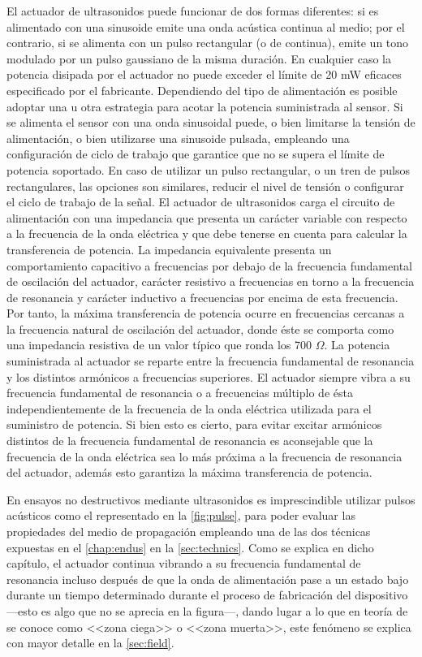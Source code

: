 El actuador de ultrasonidos puede funcionar de dos formas diferentes: si es
alimentado con una sinusoide emite una onda acústica continua al medio; por
el contrario, si se alimenta con un pulso rectangular (o de continua),
emite un tono modulado por un pulso gaussiano de la misma duración. En
cualquier caso la potencia disipada por el actuador no puede exceder el
límite de 20 mW eficaces especificado por el fabricante. Dependiendo del
tipo de alimentación es posible adoptar una u otra estrategia para acotar
la potencia suministrada al sensor. Si se alimenta el sensor con una onda
sinusoidal puede, o bien limitarse la tensión de alimentación, o bien
utilizarse una sinusoide pulsada, empleando una configuración de ciclo de
trabajo que garantice que no se supera el límite de potencia soportado. En
caso de utilizar un pulso rectangular, o un tren de pulsos rectangulares,
las opciones son similares, reducir el nivel de tensión o configurar el
ciclo de trabajo de la señal. El actuador de ultrasonidos carga el circuito
de alimentación con una impedancia que presenta un carácter variable con
respecto a la frecuencia de la onda eléctrica y que debe tenerse en cuenta
para calcular la transferencia de potencia. La impedancia equivalente
presenta un comportamiento capacitivo a frecuencias por debajo de la
frecuencia fundamental de oscilación del actuador, carácter resistivo a
frecuencias en torno a la frecuencia de resonancia y carácter inductivo a
frecuencias por encima de esta frecuencia. Por tanto, la máxima
transferencia de potencia ocurre en frecuencias cercanas a la frecuencia
natural de oscilación del actuador, donde éste se comporta como una
impedancia resistiva de un valor típico que ronda los 700 $\Omega$. La
potencia suministrada al actuador se reparte entre la frecuencia
fundamental de resonancia y los distintos armónicos a frecuencias
superiores. El actuador siempre vibra a su frecuencia fundamental de
resonancia o a frecuencias múltiplo de ésta independientemente de la
frecuencia de la onda eléctrica utilizada para el suministro de potencia.
Si bien esto es cierto, para evitar excitar armónicos distintos de la
frecuencia fundamental de resonancia es aconsejable que la frecuencia de la
onda eléctrica sea lo más próxima a la frecuencia de resonancia del
actuador, además esto garantiza la máxima transferencia de potencia.

En ensayos no destructivos mediante ultrasonidos es imprescindible utilizar
pulsos acústicos como el representado en la \cref{fig:pulse}, para poder
evaluar las propiedades del medio de propagación empleando una de las dos
técnicas expuestas en el \cref{chap:endus} en la \cref{sec:technics}. Como
se explica en dicho capítulo, el actuador continua vibrando a su frecuencia
fundamental de resonancia incluso después de que la onda de alimentación
pase a un estado bajo durante un tiempo determinado durante el proceso de
fabricación del dispositivo ---esto es algo que no se aprecia en la
figura---, dando lugar a lo que en teoría de  se conoce como
<<zona ciega>> o <<zona muerta>>, este fenómeno se explica con mayor
detalle en la \cref{sec:field}.

